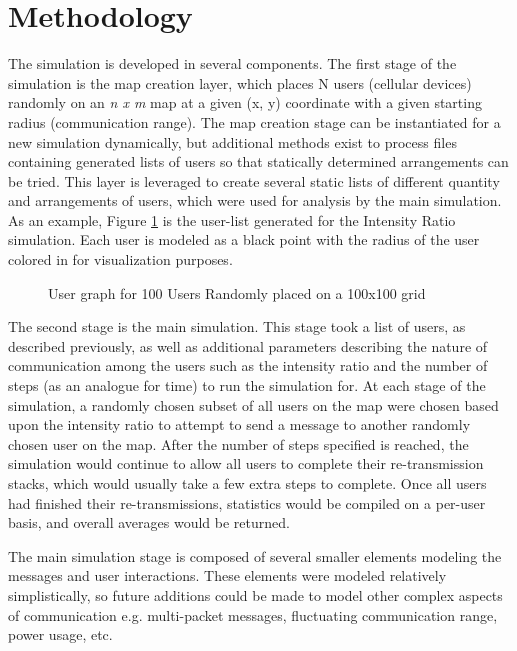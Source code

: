 \section{Methodology}
The simulation is developed in several components.
The first stage of the simulation is the map creation layer,
which places N users (cellular devices) randomly on an \textit{n x m} map at a
given (x, y) coordinate with a given starting radius (communication range).
The map creation stage can be instantiated for a new simulation dynamically, 
but additional methods exist to process files containing generated lists of 
users so that statically determined arrangements can be tried.
This layer is leveraged to create several static lists of different quantity
and arrangements of users, which were used for analysis by the main simulation.
As an example, Figure \ref{fig:usergraph} is the user-list
generated for the Intensity Ratio simulation.
Each user is modeled as a black point with the radius of the user colored in
for visualization purposes.
\par
\begin{figure}[!htb]
\begin{centering}
    
    \caption{User graph for 100 Users Randomly placed on a 100x100 grid}
    \label{fig:usergraph}
\end{centering}
\end{figure}
\par

The second stage is the main simulation.
This stage took a list of users, as described previously, as well as additional
parameters describing the nature of communication among the users such as
the intensity ratio and the number of steps (as an analogue for time) to run 
the simulation for.
At each stage of the simulation, a randomly chosen subset of all users on the map
were chosen based upon the intensity ratio to attempt to send a message to another
randomly chosen user on the map.
After the number of steps specified is reached, the simulation would continue
to allow all users to complete their re-transmission stacks, which would usually
take a few extra steps to complete.
Once all users had finished their re-transmissions, statistics would be compiled
on a per-user basis, and overall averages would be returned.

The main simulation stage is composed of several smaller elements modeling
the messages and user interactions.
These elements were modeled relatively simplistically, so future additions could be
made to model other complex aspects of communication e.g. multi-packet messages,
fluctuating communication range, power usage, etc.

